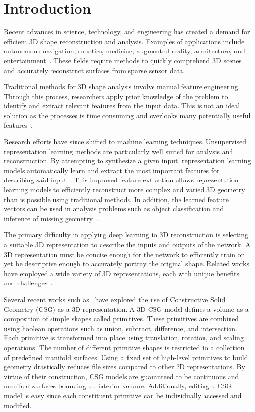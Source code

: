 \chapter{Introduction}

Recent advances in science, technology, and engineering has created a demand for efficient 3D shape reconstruction and analysis. Examples of applications include autonomous navigation, robotics, medicine, augmented reality, architecture, and entertainment~\cite{Xiao2020, Xie2022}. These fields require methods to quickly comprehend 3D scenes and accurately reconstruct surfaces from sparse sensor data.

Traditional methods for 3D shape analysis involve manual feature engineering. Through this process, researchers apply prior knowledge of the problem to identify and extract relevant features from the input data. This is not an ideal solution as the processes is time consuming and overlooks many potentially useful features~\cite{Bengio2013}.

Research efforts have since shifted to machine learning techniques. Unsupervised representation learning methods are particularly well suited for analysis and reconstruction. By attempting to synthesize a given input, representation learning models automatically learn and extract the most important features for describing said input~\cite{Bengio2013}. This improved feature extraction allows representation learning models to efficiently reconstruct more complex and varied 3D geometry than is possible using traditional methods. In addition, the learned feature vectors can be used in analysis problems such as object classification and inference of missing geometry~\cite{Park2019}.

The primary difficulty in applying deep learning to 3D reconstruction is selecting a suitable 3D representation to describe the inputs and outputs of the network. A 3D representation must be concise enough for the network to efficiently train on yet be descriptive enough to accurately portray the original shape. Related works have employed a wide variety of 3D representations, each with unique benefits and challenges~\cite{Xiao2020}.

Several recent works such as~\cite{Sharma2018, Kania2020, Ren2021} have explored the use of Constructive Solid Geometry (CSG) as a 3D representation. A 3D CSG model defines a volume as a composition of simple shapes called primitives. These primitives are combined using boolean operations such as union, subtract, difference, and intersection. Each primitive is transformed into place using translation, rotation, and scaling operations. The number of different primitive shapes is restricted to a collection of predefined manifold surfaces. Using a fixed set of high-level primitives to build geometry drastically reduces file sizes compared to other 3D representations. By virtue of their construction, CSG models are guaranteed to be continuous and manifold surfaces bounding an interior volume. Additionally, editing a CSG model is easy since each constituent primitive can be individually accessed and modified.~\cite{Hughes2013}.

